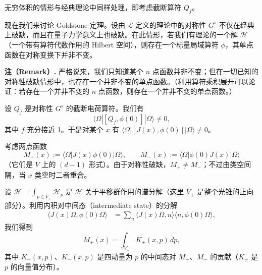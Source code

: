 
无穷体积的情形与经典理论中同样处理，即考虑截断算符 $Q_f$。

现在我们来讨论 Goldstone 定理。设由 $\mathcal{L}$ 定义的理论中的对称性 $G^s$ 不仅在经典上破缺，而且在量子力学意义上也破缺。在此情形，若我们有理论的一个解 $\mathcal{H}$（一个带有算符代数作用的 Hilbert 空间），则存在一个标量局域算符 $\phi$，其单点函数在对称变换下并非不变。

\textbf{注（Remark）.} 严格说来，我们只知道某个 $n$ 点函数并非不变；但在一切已知的对称性破缺情形中，也存在一个并非不变的单点函数。（利用算符乘积展开可以论证：若存在一个并非不变的 $n$ 点函数，则存在一个并非不变的单点函数。）

设 $Q_f$ 是对称性 $G^s$ 的截断电荷算符。我们有
\begin{equation}
  \tag{1.21}
  \label{eq:1-21}
  \langle\Omega|[Q_f,\phi(0)]|\Omega\rangle\neq0,
\end{equation}
其中 $f$ 充分接近 1。于是对某个 $x$ 有 $\langle\Omega|[J(x),\phi(0)]|\Omega\rangle\neq0$。

考虑两点函数
\begin{equation}
  \tag{1.22}
  \label{eq:1-22}
  M_+(x):=\langle\Omega|J(x)\phi(0)|\Omega\rangle,\qquad
  M_-(x):=\langle\Omega|\phi(0)J(x)|\Omega\rangle
\end{equation}
（它们是 $V$ 上的 $(d-1)$ 形式）。由于对称性破缺，$M_+\neq M_-$；不过由类空间隔，当 $x$ 类空时二者重合。

设 $\mathcal{H}=\int_{p\in V_+}\mathcal{H}_p$ 是 $\mathcal{H}$ 关于平移群作用的谱分解（这里 $V_+$ 是整个光锥的正向部分）。利用内积对中间态（intermediate state）的分解
\[
\begin{aligned}
\langle J(x)\Omega,\phi(0)\Omega\rangle
&=\sum_n\langle J(x)\Omega,n\rangle\langle n,\phi(0)\Omega\rangle,
\end{aligned}
\]
我们得到
\begin{equation}
  \tag{1.23}
  \label{eq:1-23}
  M_\pm(x)=\int_{V_+}K_\pm(x,p)\,dp,
\end{equation}
其中 $K_+(x,p)$、$K_-(x,p)$ 是四动量为 $p$ 的中间态对 $M_+$、$M_-$ 的贡献（$K_\pm$ 是 $p$ 的向量值分布）。

